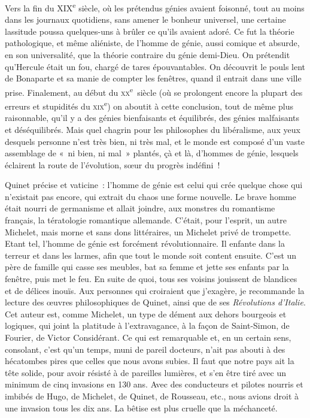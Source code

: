 \documentclass[french,twoside]{book} %
\begin{document}
Vers la fin du XIX\textsuperscript{e} siècle, où les prétendus génies avaient foisonné, tout au moins dans les journaux quotidiens, sans amener le bonheur universel, une certaine lassitude poussa quelques-uns à brûler ce qu’ils avaient adoré. Ce fut la théorie pathologique, et même aliéniste, de l’homme de génie, aussi comique et absurde, en son universalité, que la théorie contraire du génie demi-Dieu. On prétendit qu’Hercule était un fou, chargé de tares épouvantables. On découvrit le pouls lent de Bonaparte et sa manie de compter les fenêtres, quand il entrait dans une ville prise. Finalement, au début du \textsc{xx}\textsuperscript{e} siècle (où se prolongent encore la plupart des erreurs et stupidités du \textsc{xix}\textsuperscript{e}) on aboutit à cette conclusion, tout de même plus raisonnable, qu’il y a des génies bienfaisants et équilibrés, des génies malfaisants et déséquilibrés. Mais quel chagrin pour les philosophes du libéralisme, aux yeux desquels personne n’est très bien, ni très mal, et le monde est composé d’un vaste assemblage de « ni bien, ni mal » plantés, çà et là, d’hommes de génie, lesquels éclairent la route de l’évolution, sœur du progrès indéfini !\par
Quinet précise et vaticine : l’homme de génie est celui qui crée quelque chose qui n’existait pas encore, qui extrait du chaos une forme nouvelle. Le brave homme était nourri de germanisme et allait joindre, aux monstres du romantisme français, la tératologie romantique allemande. C’était, pour l’esprit, un autre Michelet, mais morne et sans dons littéraires, un Michelet privé de trompette. Etant tel, l’homme de génie est forcément révolutionnaire. Il enfante dans la terreur et dans les larmes, afin que tout le monde soit content ensuite. C’est un père de famille qui casse ses meubles, bat sa femme et jette ses enfants par la fenêtre, puis met le feu. En suite de quoi, tous ses voisins jouissent de blandices et de délices inouïs. Aux personnes qui croiraient que j’exagère, je recommande la lecture des œuvres philosophiques de Quinet, ainsi que de ses {\itshape Révolutions d’Italie}. Cet auteur est, comme Michelet, un type de dément aux dehors bourgeois et logiques, qui joint la platitude à l’extravagance, à la façon de Saint-Simon, de Fourier, de Victor Considérant. Ce qui est remarquable et, en un certain sens, consolant, c’est qu’un temps, muni de pareil docteurs, n’ait pas abouti à des hécatombes pires que celles que nous avons subies. Il faut que notre pays ait la tête solide, pour avoir résisté à de pareilles lumières, et s’en être tiré avec un minimum de cinq invasions en 130 ans. Avec des conducteurs et pilotes nourris et imbibés de Hugo, de Michelet, de Quinet, de Rousseau, etc., nous avions droit à une invasion tous les dix ans. La bêtise est plus cruelle que la méchanceté.\par
\end{document}
